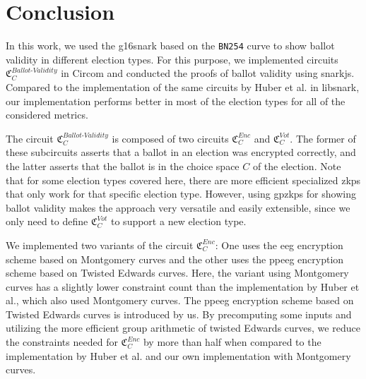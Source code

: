 \chapter{Conclusion}
\label{chap:conclusion}

In this work, we used the \gls{g16snark} based on the \verb|BN254| curve to show ballot validity in different election types.
For this purpose, we implemented circuits $\mathfrak{C}_C^{Ballot\text{-}Validity}$ in Circom and conducted the proofs of ballot validity using snarkjs.
Compared to the implementation of the same circuits by Huber et al. in libsnark, our implementation performs better in most of the election types for all of the considered metrics.

The circuit $\mathfrak{C}_C^{Ballot\text{-}Validity}$ is composed of two circuits $\mathfrak{C}_C^{Enc}$ and $\mathfrak{C}_C^{Vot}$.
The former of these subcircuits asserts that a ballot in an election was encrypted correctly, and the latter asserts that the ballot is in the choice space $C$ of the election.
Note that for some election types covered here, there are more efficient specialized \glspl{zkp} that only work for that specific election type.
However, using \glspl{gpzkp} for showing ballot validity makes the approach very versatile and easily extensible, since we only need to define $\mathfrak{C}_C^{Vot}$ to support a new election type.

We implemented two variants of the circuit $\mathfrak{C}_C^{Enc}$: One uses the \gls{eeg} encryption scheme based on Montgomery curves and the other uses the \gls{ppeeg} encryption scheme based on Twisted Edwards curves.
Here, the variant using Montgomery curves has a slightly lower constraint count than the implementation by Huber et al., which also used Montgomery curves.
The \gls{ppeeg} encryption scheme based on Twisted Edwards curves is introduced by us.
By precomputing some inputs and utilizing the more efficient group arithmetic of twisted Edwards curves, we reduce the constraints needed for $\mathfrak{C}_C^{Enc}$ by more than half when compared to the implementation by Huber et al. and our own implementation with Montgomery curves.

